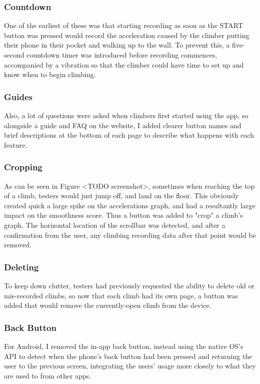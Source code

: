 \subsubsection{Countdown}
One of the earliest of these was that starting recording as soon as the START button was pressed would record the acceleration caused by the climber putting their phone in their pocket and walking up to the wall.
To prevent this, a five-second countdown timer was introduced before recording commences, accompanied by a vibration so that the climber could have time to set up and know when to begin climbing.

\subsubsection{Guides}
Also, a lot of questions were asked when climbers first started using the app, so alongside a guide and FAQ on the website, I added clearer button names and brief descriptions at the bottom of each page to describe what happens with each feature.


\subsubsection{Cropping}
As can be seen in Figure <TODO screenshot>, sometimes when reaching the top of a climb, testers would just jump off, and land on the floor.
This obviously created quick a large spike on the accelerations graph, and had a resultantly large impact on the smoothness score.
Thus a button was added to "crop" a climb's graph.
The horizontal location of the scrollbar was detected, and after a confirmation from the user, any climbing recording data after that point would be removed.

\subsubsection{Deleting}
To keep down clutter, testers had previously requested the ability to delete old or mis-recorded climbs, so now that each climb had its own page, a button was added that would remove the currently-open climb from the device.


\subsubsection{Back Button}
For Android, I removed the in-app back button, instead using the native OS's API to detect when the phone's back button had been pressed and returning the user to the previous screen, integrating the users' usage more closely to what they are used to from other apps.



